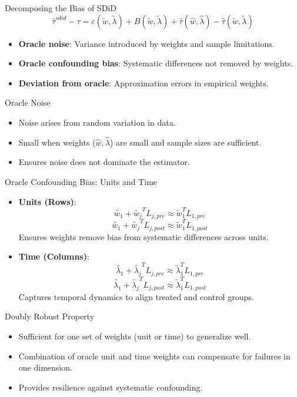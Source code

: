 \documentclass{beamer}
\begin{document}
\begin{frame}{Decomposing the Bias of SDiD}
\[
\widehat{\tau}^{sdid} - \tau = \varepsilon(\widetilde{w}, \widetilde{\lambda}) + B(\widetilde{w}, \widetilde{\lambda}) + \widehat{\tau}(\widehat{w},\widehat{\lambda}) - \widehat{\tau}(\widetilde{w},\widetilde{\lambda})
\]
\begin{itemize}
\item \textbf{Oracle noise}: Variance introduced by weights and sample limitations.
\item \textbf{Oracle confounding bias}: Systematic differences not removed by weights.
\item \textbf{Deviation from oracle}: Approximation errors in empirical weights.
\end{itemize}
\end{frame}

\begin{frame}{Oracle Noise}
\begin{itemize}
\item Noise arises from random variation in data.
\item Small when weights (\(\hat{w}, \hat{\lambda}\)) are small and sample sizes are sufficient.
\item Ensures noise does not dominate the estimator.
\end{itemize}
\end{frame}

\begin{frame}{Oracle Confounding Bias: Units and Time}
\begin{itemize}
\item \textbf{Units (Rows)}:
    \[
    \widetilde{w_1} + \widetilde{w_{j}}^TL_{j,pre} \approx \widetilde{w}_1^TL_{1,pre}
    \]
    \[
    \widetilde{w_1} + \widetilde{w_{j}}^TL_{j,post} \approx \widetilde{w}_1^TL_{1,post}
    \]
    Ensures weights remove bias from systematic differences across units.
\item \textbf{Time (Columns)}:
    \[
    \widetilde{\lambda_1} + \widetilde{\lambda_{j}}^TL_{j,pre} \approx \widetilde{\lambda}_1^TL_{1,pre}
    \]
    \[
    \widetilde{\lambda_1} + \widetilde{\lambda_{j}}^TL_{j,post} \approx \widetilde{\lambda}_1^TL_{1,post}
    \]
    Captures temporal dynamics to align treated and control groups.
\end{itemize}
\end{frame}

\begin{frame}{Doubly Robust Property}
\begin{itemize}
\item Sufficient for one set of weights (unit or time) to generalize well.
\item Combination of oracle unit and time weights can compensate for failures in one dimension.
\item Provides resilience against systematic confounding.
\end{itemize}
\end{frame}
\end{document}
